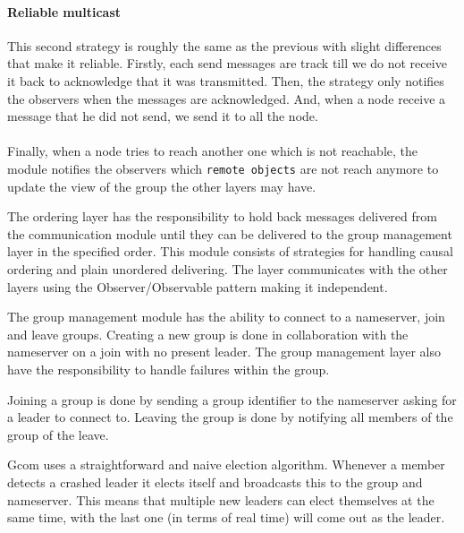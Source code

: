 \paragraph{Reliable multicast}{
    This second strategy is roughly the same as the previous with slight
 differences that make it reliable. Firstly, each send messages are track
 till we do not receive it back to acknowledge that it was transmitted.
 Then, the strategy only notifies the observers when the messages are
 acknowledged. And, when a node receive a message that he did not
 send, we send it to all the node. \newline
}

\paragraph{}{
    Finally, when a node tries to reach another one which is not
 reachable, the module notifies the observers which \texttt{remote objects}
 are not reach anymore to update the view of the group the other layers may have.
}

	The ordering layer has the responsibility to hold back messages delivered from the communication module until they can be delivered to the group management layer in the specified order.
	This module consists of strategies for handling causal ordering and plain unordered delivering.
	The layer communicates with the other layers using the Observer/Observable pattern making it independent.



	The group management module has the ability to connect to a nameserver, join and leave groups.
	Creating a new group is done in collaboration with the nameserver on a join with no present leader.
	The group management layer also have the responsibility to handle failures within the group.


	Joining a group is done by sending a group identifier to the nameserver asking for a leader to connect to.
	Leaving the group is done by notifying all members of the group of the leave.


		Gcom uses a straightforward and naive election algorithm.
		Whenever a member detects a crashed leader it elects itself and broadcasts this to the group and nameserver.
		This means that multiple new leaders can elect themselves at the same time, with the last one (in terms of real time) will come out as the leader.

